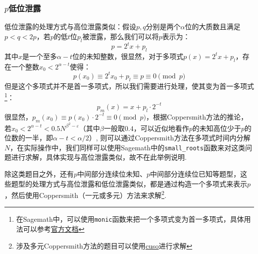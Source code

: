 \documentclass{book}
\numberwithin{equation}{subsubsection}
\begin{document}
\subsubsection*{$p$低位泄露}
低位泄露的处理方式与高位泄露类似：假设$p,q$分别是两个$\alpha$位的大质数且满足$p<q<2p$，若$p$的低$t$位$p_l$被泄露，那么我们可以将$p$表示为：
\begin{equation}
    p=2^{t}x+p_l
    \nonumber
\end{equation}
其中$x$是一个至多$\alpha-t$位的未知整数，很显然，对于多项式$p(x)=2^{t}x+p_l$，存在一个整数$x_0<2^{\alpha-t}$使得：
\begin{equation}
    p(x_0)\equiv 2^{t}x_0+p_l\equiv p\equiv 0\pmod{p}
    \nonumber
\end{equation}
但是这个多项式并不是首一多项式，所以我们需要进行处理，使其变为首一多项式\footnote{在Sagemath中，可以使用\texttt{monic}函数来把一个多项式变为首一多项式，具体用法可以参考\href{https://doc.sagemath.org/html/en/reference/polynomial\_rings/sage/rings/polynomial/polynomial\_zmod\_flint.html\#sage.rings.polynomial.polynomial\_zmod\_flint.Polynomial\_zmod\_flint.monic}{官方文档}}：
\begin{equation}
    p_m(x) = x + p_l\cdot2^{-t}
\end{equation}
很显然，$p_m(x_0)\equiv p(x_0)\cdot 2^{-t}\equiv 0\pmod{p}$，根据Coppersmith方法的推论，
若$x_0<2^{\alpha-t}<0.5N^{\beta^2-\varepsilon}$（其中$\beta$一般取$0.4$，可以近似地看作$p$的未知高位少于$p$的位数的一半，即$\alpha-t<\alpha/2$）,
则可以通过Coppersmith方法在多项式时间内分解$N$，在实际操作中，我们同样可以使用Sagemath中的\texttt{small\_roots}函数来对这类问题进行求解，具体实现与高位泄露类似，故不在此举例说明.\par
除这类题目之外，还有$p$中间部分连续位未知、$p$中间部分连续位已知等题型，这些题型的处理方式与高位泄露和低位泄露类似，都是通过构造一个多项式来表示$p$，然后使用Coppersmith（一元或多元）方法来求解\footnote{涉及多元Coppersmith方法的题目可以使用\href{https://github.com/keeganryan/cuso}{cuso}进行求解}.\par
\end{document}
